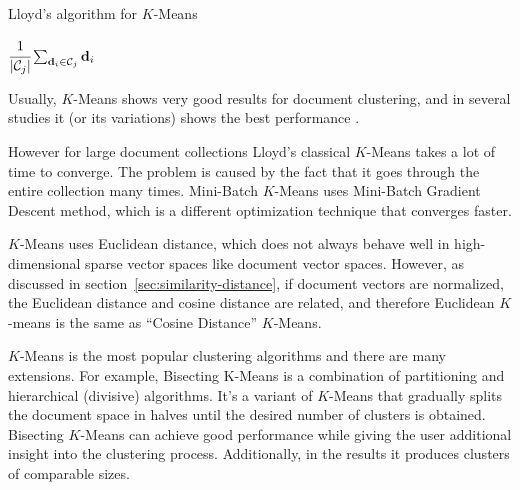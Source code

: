 \begin{algorithm}
\caption{Lloyd's algorithm for $K$-Means}
\label{algo:k-means}

\begin{algorithmic}[0]
  \Statex
     
    \EndFor

       
      \EndFor

       
            {$\cfrac{1}{| \mathcal C_j |} \sum_{\mathbf d_i \in \mathcal C_j} \mathbf d_i$}
      \EndFor
    \EndWhile

    \State {}
  \EndFunction
\end{algorithmic}
\end{algorithm}

Usually, $K$-Means shows very good results for document clustering, and in
several studies it (or its variations) shows the best performance
\cite{steinbach2000comparison} \cite{hall2012evaluating} .

However for large document collections Lloyd's classical $K$-Means takes a lot
of time to converge. The problem is caused by the fact that it goes through
the entire collection many times. Mini-Batch $K$-Means \cite{sculley2010web}
uses Mini-Batch Gradient Descent method, which is a different optimization technique
that converges faster.

$K$-Means uses Euclidean distance, which does not always behave
well in high-dimensional sparse vector spaces like document vector
spaces. However, as discussed in section~\ref{sec:similarity-distance}, if
document vectors are normalized, the Euclidean distance and cosine distance
are related, and therefore Euclidean $K$-means is the same as
``Cosine Distance'' $K$-Means.

$K$-Means is the most popular clustering algorithms and there are
many extensions. For example, Bisecting K-Means
\cite{steinbach2000comparison} is a combination
of partitioning and hierarchical (divisive) algorithms. It's a
variant of $K$-Means that gradually splits the document space in halves
until the desired number of clusters is obtained. Bisecting $K$-Means can
achieve good performance while giving the user additional insight into
the clustering process. Additionally, in the results it produces
clusters of comparable sizes.

